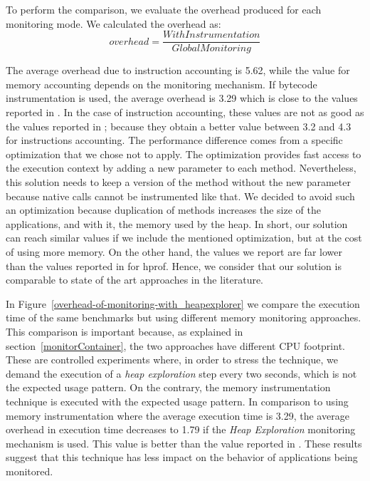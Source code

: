 To perform the comparison, we evaluate the overhead produced for each monitoring mode. We calculated the overhead as: \[overhead=\frac{WithInstrumentation}{GlobalMonitoring}\]

The average overhead due to instruction accounting is 5.62, while the value for memory accounting depends on the monitoring mechanism.
If bytecode instrumentation is used, the average overhead is 3.29 which is close to the values reported in \cite{Binder:2009:PPV:1464245.1464249}.
In the case of instruction accounting, these values are not as good as the values reported in \cite{Binder:2009:PPV:1464245.1464249}; because they obtain a better value between 3.2 and 4.3 for instructions accounting.
The performance difference comes from a specific optimization that we chose not to apply.
The optimization provides fast access to the execution context by adding a new parameter to each method.
Nevertheless, this solution needs to keep a version of the method without the new parameter because native calls cannot be instrumented like that. 
We decided to avoid such an optimization because duplication of methods increases the size of the applications, and with it, the memory used by the heap.
In short, our solution can reach similar values if we include the mentioned optimization, but at the cost of using more memory.
On the other hand, the values we report are far lower than the values reported in \cite{Binder:2009:PPV:1464245.1464249} for hprof.
Hence, we consider that our solution is comparable to state of the art approaches in the literature.

In Figure~\ref{overhead-of-monitoring-with_heapexplorer} we compare the execution time of the same benchmarks but using different memory monitoring approaches.
This comparison is important because, as explained in section~\ref{monitorContainer}, the two approaches have different CPU footprint.
These are controlled experiments where, in order to stress the technique, we demand the execution of a \textit{heap exploration} step every two seconds, which is not the expected usage pattern.
On the contrary, the memory instrumentation technique is executed with the expected usage pattern.
In comparison to using memory instrumentation where the average execution time is 3.29, the average overhead in execution time  decreases to 1.79 if the \textit{Heap Exploration} monitoring mechanism is used.
This value is better than the value reported in \cite{Binder:2009:PPV:1464245.1464249}.
These results suggest that this technique has less impact on the behavior of applications being monitored.

